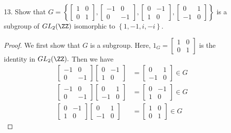 \documentclass{article}
\begin{document}
\begin{itemize}
\begin{proof}
		\end{proof}

	\item[13.] Show that $G=\left\{ \begin{bmatrix}
			1 & 0 \\ 0 & 1
		\end{bmatrix}, \begin{bmatrix}
			-1 & 0 \\ 0 & -1
		\end{bmatrix}, \begin{bmatrix}
			0 & -1 \\ 1 & 0 
		\end{bmatrix}, \begin{bmatrix}
			0 & 1 \\ -1 & 0
		\end{bmatrix}\right\}$ is a subgroup of $GL_2(\ZZ)$ isomorphic to $\left\{ 1, -1, i, -i \right\}.$
		\begin{proof}
			We first show that $G$ is a subgroup. Here, $1_G=\begin{bmatrix}
				1 & 0 \\ 0 & 1
			\end{bmatrix}$ is the identity in $GL_2(\ZZ).$ Then we have
			\begin{align*}
				\begin{bmatrix}
					-1 & 0 \\ 0 & -1
				\end{bmatrix} \begin{bmatrix}
					0 & -1 \\ 1 & 0 
				\end{bmatrix} &= \begin{bmatrix}
					0 & 1 \\ -1 & 0
				\end{bmatrix}\in G \\
				\begin{bmatrix}
					-1 & 0 \\ 0 & -1
				\end{bmatrix}\begin{bmatrix}
					0 & 1 \\ -1 & 0
				\end{bmatrix} &= \begin{bmatrix}
					0 & -1 \\ 1 & 0
				\end{bmatrix}\in G \\
				\begin{bmatrix}
					0 & -1 \\ 1 & 0
				\end{bmatrix}\begin{bmatrix}
					0 & 1 \\ -1 & 0
				\end{bmatrix} &= \begin{bmatrix}
					1 & 0 \\ 0 & 1
				\end{bmatrix}\in G
			\end{align*} 


\end{proof}
\end{itemize}
\end{document}
